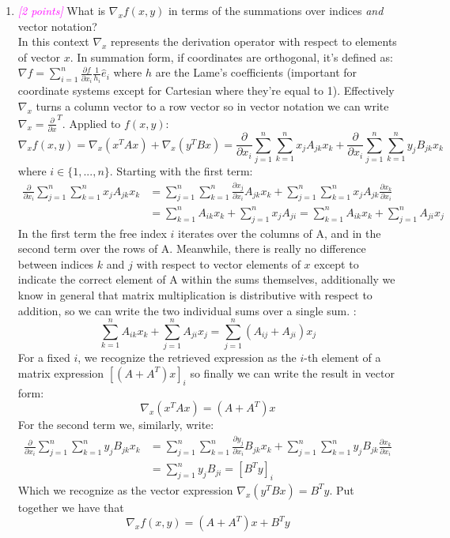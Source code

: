 \documentclass{article}
\newcommand{\1}{\mathbf{1}}
\newcommand{\points}[1]{\small\textcolor{magenta}{\emph{[#1 points]}} \normalsize}
\begin{document}
\begin{enumerate}
	\item \points{2} What is $\nabla_x f(x,y)$ in terms of the summations over indices \emph{and} vector notation?\\
	In this context $\nabla_x$ represents the derivation operator with respect to elements of vector $x$. In summation form, if coordinates are orthogonal, it's defined as: $\nabla f = \sum_{i=1}^n \frac{\partial f}{\partial x_i}\frac{1}{h_i}\hat e_i$ where $h$ are the Lame's coefficients (important for coordinate systems except for Cartesian where they're equal to 1). Effectively $\nabla_x$ turns a column vector to a row vector so in vector notation we can write $\nabla_x = \frac{\partial}{\partial x}^T$. Applied to $f(x,y)$:
	$$ \nabla_x f(x, y) = \nabla_x (x^TAx) + \nabla_x (y^TBx) = 
	\frac{\partial }{\partial x_i}\sum_{j=1}^n\sum_{k=1}^n x_jA_{jk}x_k 
	+
	\frac{\partial}{\partial x_i} \sum_{j=1}^n \sum_{k=1}^n y_jB_{jk}x_k $$
	where $i \in \{1,...,n\}$. Starting with the first term:
	\begin{align*}
	  \frac{\partial}{\partial x_i}\sum_{j=1}^n\sum_{k=1}^n x_jA_{jk}x_k &= 
	  \sum_{j=1}^n\sum_{k=1}^n \frac{\partial x_j}{\partial x_i}A_{jk}x_k +
	  \sum_{j=1}^n\sum_{k=1}^n x_jA_{jk}\frac{\partial x_k}{\partial x_i} \\
	  &= \sum_{k=1}^n A_{ik}x_k + \sum_{j=1}^n x_jA_{ji} = \sum_{k=1}^n A_{ik}x_k + \sum_{j=1}^n A_{ji}x_j
	\end{align*}
	In the first term the free index $i$ iterates over the columns of A, and in the second term over the rows of A. Meanwhile, there is really no difference between indices $k$ and $j$ with respect to vector elements of $x$ except to indicate the correct element of A within the sums themselves, additionally we know in general that matrix multiplication is distributive with respect to addition, so we can write the two individual sums over a single sum. :
	$$ \sum_{k=1}^n A_{ik}x_k + \sum_{j=1}^n A_{ji}x_j = \sum_{j=1}^n (A_{ij} + A_{ji})x_j$$
	For a fixed $i$, we recognize the retrieved expression as the $i$-th element of a matrix expression $[(A+A^T)x]_i$ so finally we can write the result in vector form:
	$$\nabla_x (x^TAx) = (A+A^T)x$$
	For the second term we, similarly, write:
	\begin{align*}
	  \frac{\partial}{\partial x_i}\sum_{j=1}^n\sum_{k=1}^n y_jB_{jk}x_k &= 
	  \sum_{j=1}^n\sum_{k=1}^n \frac{\partial y_j}{\partial x_i}B_{jk}x_k +
	  \sum_{j=1}^n\sum_{k=1}^n y_jB_{jk}\frac{\partial x_k}{\partial x_i} \\
	  &= \sum_{j=1}^n y_jB_{ji}   = \left[B^Ty\right]_i
	\end{align*}
	Which we recognize as the vector expression $\nabla_x (y^TBx) = B^Ty$. Put together we have that 
	$$\nabla_x f(x,y) = (A+A^T)x + B^Ty$$
	

\end{enumerate}
\end{document}
